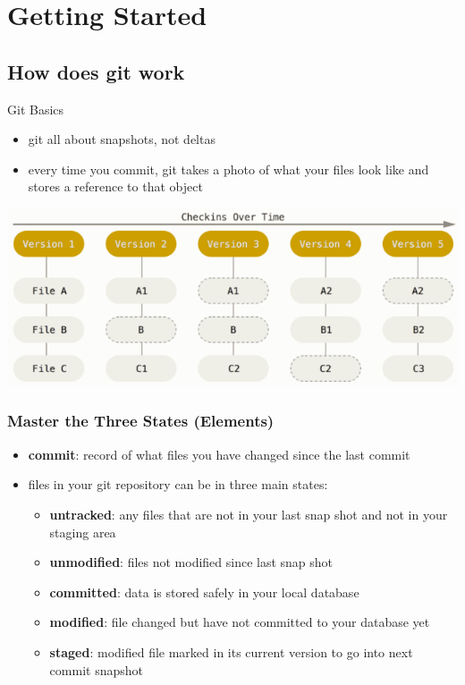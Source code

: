 \documentclass[12pt]{beamer}
\begin{document}
\section{Getting Started}
\subsection{How does git work}
\begin{frame}{Git Basics}
\begin{itemize}
	\item git all about snapshots, not deltas
	\item every time you commit, git takes a photo of what your files look like and stores a reference to that object
	\end{itemize}
\begin{center}
	\includegraphics[width=0.7\linewidth]{git_theory}
\end{center}
\end{frame}
\begin{frame}
\frametitle{Master the Three States (Elements)}
\begin{itemize}
	\item \textbf{commit}: record of what files you have changed since the last commit
	\item files in your git repository can be in three main states:
	\begin{itemize}
		\item \textbf{untracked}: any files that are not in your last snap shot and not in your staging area
		\item \textbf{unmodified}: files not modified since last snap shot
		\item \textbf{committed}: data is stored safely in your local database
		\item \textbf{modified}: file changed but have not committed to your database yet
		\item \textbf{staged}: modified file marked in its current version to go into next commit snapshot 
	\end{itemize}
\end{itemize}
\end{frame}
\end{document}
